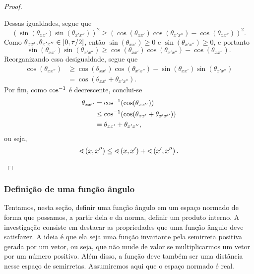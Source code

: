 \begin{proof}
\begin{enumerate}
	Dessas igualdades, segue que
		\begin{equation*}
		(\sin(\theta_{xx'}) \sin(\theta_{x'x''}))^2 \geq (\cos(\theta_{xx'})\cos(\theta_{x'x''}) - \cos(\theta_{xx''}))^2.
		\end{equation*}
	Como $\theta_{xx'}, \theta_{x'x''} \in \left[0,\allowbreak \tau/2\right]$, então $\sin(\theta_{xx'}) \geq 0$ e $\sin(\theta_{x'x''}) \geq 0$, e portanto
		\begin{equation*}
		\sin(\theta_{xx'}) \sin(\theta_{x'x''}) \geq \cos(\theta_{xx'})\cos(\theta_{x'x''}) - \cos(\theta_{xx''}).
		\end{equation*}
	Reorganizando essa desigualdade, segue que
		\begin{align*}
		\cos(\theta_{xx''}) &\geq \cos(\theta_{xx'})\cos(\theta_{x'x''}) - \sin(\theta_{xx'}) \sin(\theta_{x'x''}) \\
			&= \cos(\theta_{xx'} + \theta_{x'x''}).
		\end{align*}
	Por fim, como $\cos^{-1}$ é decrescente, conclui-se
		\begin{align*}
		\theta_{xx''} &= \cos^{-1}(\cos(\theta_{xx''})) \\
			&\leq \cos^{-1}(\cos(\theta_{xx'} + \theta_{x'x''})) \\
			&= \theta_{xx'} + \theta_{x'x''},
		\end{align*}
	ou seja,
		\begin{equation*}
		\sphericalangle\left({x},{x''}\right) \leq \sphericalangle\left({x},{x'}\right) + \sphericalangle\left({x'},{x''}\right).
		\qedhere
		\end{equation*}
	\end{enumerate}

\end{proof}



\subsubsection{Definição de uma função ângulo}

Tentamos, nesta seção, definir uma função ângulo em um espaço normado de forma que possamos, a partir dela e da norma, definir um produto interno. A investigação consiste em destacar as propriedades que uma função ângulo deve satisfazer. A ideia é que ela seja uma função invariante pela semirreta positiva gerada por um vetor, ou seja, que não mude de valor se multiplicarmos um vetor por um número positivo. Além disso, a função deve também ser uma distância nesse espaço de semirretas. Assumiremos aqui que o espaço normado é real.

